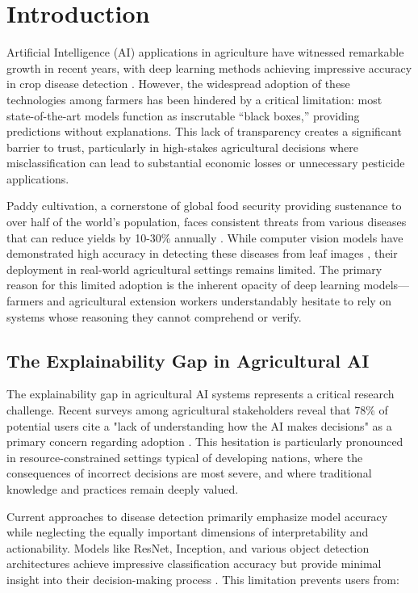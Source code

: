 \section{Introduction}

Artificial Intelligence (AI) applications in agriculture have witnessed remarkable growth in recent years, with deep learning methods achieving impressive accuracy in crop disease detection \cite{kamilaris2018deep, mohanty2016using}. However, the widespread adoption of these technologies among farmers has been hindered by a critical limitation: most state-of-the-art models function as inscrutable ``black boxes,'' providing predictions without explanations. This lack of transparency creates a significant barrier to trust, particularly in high-stakes agricultural decisions where misclassification can lead to substantial economic losses or unnecessary pesticide applications.

Paddy cultivation, a cornerstone of global food security providing sustenance to over half of the world's population, faces consistent threats from various diseases that can reduce yields by 10-30\% annually \cite{savary2019global}. While computer vision models have demonstrated high accuracy in detecting these diseases from leaf images \cite{rahman2020deep}, their deployment in real-world agricultural settings remains limited. The primary reason for this limited adoption is the inherent opacity of deep learning models—farmers and agricultural extension workers understandably hesitate to rely on systems whose reasoning they cannot comprehend or verify.

\subsection{The Explainability Gap in Agricultural AI}

The explainability gap in agricultural AI systems represents a critical research challenge. Recent surveys among agricultural stakeholders reveal that 78\% of potential users cite a "lack of understanding how the AI makes decisions" as a primary concern regarding adoption \cite{wolfert2017big}. This hesitation is particularly pronounced in resource-constrained settings typical of developing nations, where the consequences of incorrect decisions are most severe, and where traditional knowledge and practices remain deeply valued.

Current approaches to disease detection primarily emphasize model accuracy while neglecting the equally important dimensions of interpretability and actionability. Models like ResNet, Inception, and various object detection architectures achieve impressive classification accuracy but provide minimal insight into their decision-making process \cite{ferentinos2018deep}. This limitation prevents users from:

